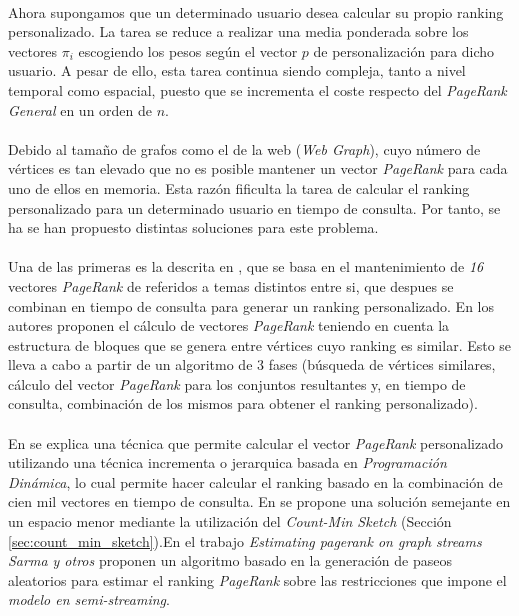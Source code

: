 \documentclass{subfiles}
\begin{document}
      \paragraph{}
      Ahora supongamos que un determinado usuario desea calcular su propio ranking personalizado. La tarea se reduce a realizar una media ponderada sobre los vectores $\pi_i$ escogiendo los pesos según el vector $p$ de personalización para dicho usuario. A pesar de ello, esta tarea continua siendo compleja, tanto a nivel temporal como espacial, puesto que se incrementa el coste respecto del \emph{PageRank General} en un orden de $n$.

      \paragraph{}
      Debido al tamaño de grafos como el de la web (\emph{Web Graph}), cuyo número de vértices es tan elevado que no es posible mantener un vector \emph{PageRank} para cada uno de ellos en memoria. Esta razón fificulta la tarea de calcular el ranking personalizado para un determinado usuario en tiempo de consulta. Por tanto, se ha se han propuesto distintas soluciones para este problema.

      \paragraph{}
      Una de las primeras es la descrita en \cite{haveliwala2002topic}, que se basa en el mantenimiento de \emph{16} vectores \emph{PageRank} de referidos a temas distintos entre si, que despues se combinan en tiempo de consulta para generar un ranking personalizado. En \cite{kamvar2003exploiting} los autores proponen el cálculo de vectores \emph{PageRank} teniendo en cuenta la estructura de bloques que se genera entre vértices cuyo ranking es similar. Esto se lleva a cabo a partir de un algoritmo de 3 fases (búsqueda de vértices similares, cálculo del vector \emph{PageRank} para los conjuntos resultantes y, en tiempo de consulta, combinación de los mismos para obtener el ranking personalizado).

      \paragraph{}
      En \cite{jeh2003scaling} se explica una técnica que permite calcular el vector \emph{PageRank} personalizado utilizando una técnica incrementa o jerarquica basada en \emph{Programación Dinámica}, lo cual permite hacer calcular el ranking basado en la combinación de cien mil vectores en tiempo de consulta. En \cite{sarlos2006randomize} se propone una solución semejante en un espacio menor mediante la utilización del \emph{Count-Min Sketch} (Sección \ref{sec:count_min_sketch}).En el trabajo \emph{Estimating pagerank on graph streams} \cite{sarma2011estimating} \emph{Sarma y otros} proponen un algoritmo basado en la generación de paseos aleatorios para estimar el ranking \emph{PageRank} sobre las restricciones que impone el \emph{modelo en semi-streaming}.
\end{document}
